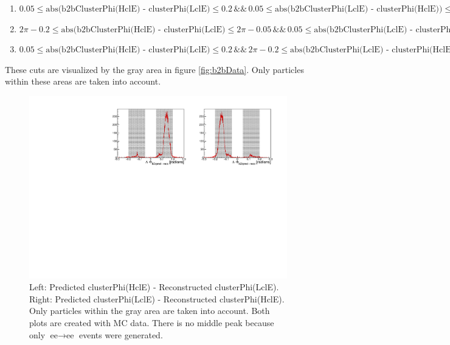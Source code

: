 \documentclass[a4paper,11pt,twosided,final,german,openbib,pdftex,listof=totoc,bibliography=totoc]{scrbook}
\begin{document}
\begin{enumerate}[label=(\alph*)]
	\item $0.05 \leq \textrm{abs(b2bClusterPhi(HclE) - clusterPhi(LclE)} \leq 0.2 \, \&\& \, 0.05 \leq \textrm{abs(b2bClusterPhi(LclE) - clusterPhi(HclE))} \leq 0.2$
	\item $2\pi - 0.2 \leq \textrm{abs(b2bClusterPhi(HclE) - clusterPhi(LclE)} \leq 2\pi - 0.05 \, \&\& \, 0.05 \leq \textrm{abs(b2bClusterPhi(LclE) - clusterPhi(HclE))} \leq 0.2$
	\item $0.05 \leq \textrm{abs(b2bClusterPhi(HclE) - clusterPhi(LclE)} \leq 0.2 \, \&\& \, 2\pi - 0.2 \leq \textrm{abs(b2bClusterPhi(LclE) - clusterPhi(HclE))} \leq 2\pi - 0.05$
\end{enumerate}

These cuts are visualized by the gray area in figure \ref{fig:b2bData}. Only particles within these areas are taken into account.




\begin{figure}[h!]
	\centering
	\includegraphics[width=\textwidth]{Plots/sb2b_MC.pdf}
	\caption[b2bClusterPhi - clusterPhi For MC]{Left: Predicted clusterPhi(HclE) - Reconstructed clusterPhi(LclE). Right: Predicted clusterPhi(LclE) - Reconstructed clusterPhi(HclE). Only particles within the gray area are taken into account. Both plots are created with MC data. There is no middle peak because only $\textrm{ee} \rightarrow \textrm{ee}$ events were generated.}
	\label{fig:b2bMC}
\end{figure}
\end{document}
